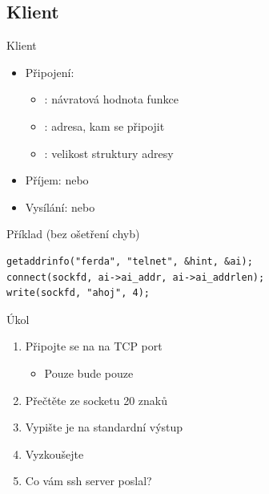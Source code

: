 \subsection*{Klient}
\frame{\subsectionpage}

\begin{frame}[fragile]{Klient}

  \begin{itemize}
    \item Připojení: { \footnotesize
       \\
      }
    \begin{itemize}
      \item {}: návratová hodnota funkce 
      \item {}: adresa, kam se připojit
      \item {}: velikost struktury adresy
    \end{itemize}

\ifpcdirlinux
    \pause

    \item Příjem:  nebo 

    \item Vysílání:  nebo 
\fi
  \end{itemize}

  \pause

  \begin{block}{Příklad (bez ošetření chyb)}
  \begin{lstlisting}
getaddrinfo("ferda", "telnet", &hint, &ai);
connect(sockfd, ai->ai_addr, ai->ai_addrlen);
write(sockfd, "ahoj", 4);
  \end{lstlisting}
  \end{block}

\end{frame}

\begin{frame}{Úkol}

  \begin{enumerate}
    \item Připojte se na  na TCP port 
    \begin{itemize}
      \item Pouze  bude pouze 
    \end{itemize}

    \item Přečtěte ze socketu 20 znaků
    \item Vypište je na standardní výstup
    \item Vyzkoušejte
    \item Co vám ssh server poslal?
  \end{enumerate}

\end{frame}

